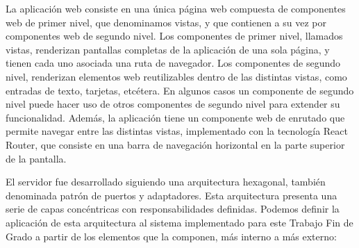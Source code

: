 \documentclass[a4paper, 12pt]{book}
\begin{document}
La aplicación web consiste en una única página web compuesta de componentes web de primer nivel, que denominamos vistas, y que contienen a su vez por componentes web de segundo nivel.
Los componentes de primer nivel, llamados vistas, renderizan pantallas completas de la aplicación de una sola página, y tienen cada uno asociada una ruta de navegador.
Los componentes de segundo nivel, renderizan elementos web reutilizables dentro de las distintas vistas, como entradas de texto, tarjetas, etcétera. En algunos casos un componente de segundo nivel puede hacer uso de otros componentes de segundo nivel para extender su funcionalidad.
Además, la aplicación tiene un componente web de enrutado que permite navegar entre las distintas vistas, implementado con la tecnología React Router, que consiste en una barra de navegación horizontal en la parte superior de la pantalla.

El servidor fue desarrollado siguiendo una arquitectura hexagonal, también denominada patrón de puertos y adaptadores. Esta arquitectura presenta una serie de capas concéntricas con responsabilidades definidas.
Podemos definir la aplicación de esta arquitectura al sistema implementado para este Trabajo Fin de Grado a partir de los elementos que la componen, más interno a más externo:
\end{document}
